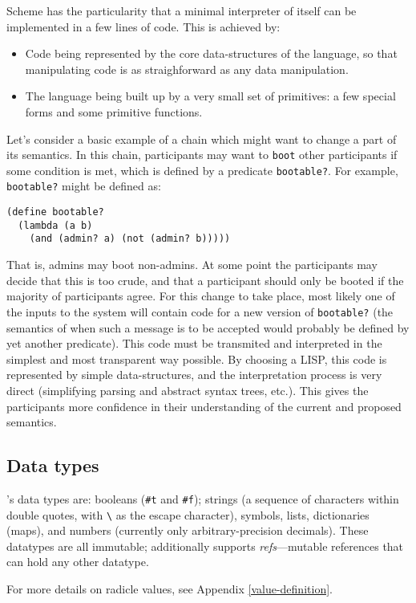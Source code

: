 Scheme has the particularity that a minimal interpreter of itself can
be implemented in a few lines of code. This is achieved by:
\begin{itemize}
  \item Code being represented by the core data-structures of the language, so
      that manipulating code is as straighforward as any data manipulation.
  \item The language being built up by a very small set of primitives: a few
    special forms and some primitive functions.
\end{itemize}
Let's consider a basic example of a chain which might want to change a part of
its semantics. In this chain, participants may want to \texttt{boot} other
participants if some condition is met, which is defined by a predicate
\texttt{bootable?}. For example, \texttt{bootable?} might be defined as:
\begin{lstlisting}
(define bootable?
  (lambda (a b)
    (and (admin? a) (not (admin? b)))))
\end{lstlisting}
That is, admins may boot non-admins. At some point the participants may decide
that this is too crude, and that a participant should only be booted if the
majority of participants agree. For this change to take place, most likely one of
the inputs to the system will contain code for a new version of
\texttt{bootable?} (the semantics of when such a message is to be accepted would
probably be defined by yet another predicate). This code must be transmited and
interpreted in the simplest and most transparent way possible. By choosing a LISP,
this code is represented by simple data-structures, and the interpretation process is
very direct (simplifying parsing and abstract syntax trees, etc.). This
gives the participants more confidence in their understanding of the current and
proposed semantics.

\subsection{Data types}
\rad{}'s data types are: booleans (\texttt{\#t} and
\texttt{\#f}); strings (a sequence of characters within double quotes, with
\verb$\$ as the escape character), symbols, lists, dictionaries
(maps), and numbers (currently only arbitrary-precision decimals). These
datatypes are all immutable; additionally \rad{} supports \emph{refs}---mutable
references that can hold any other datatype.

For more details on radicle values, see Appendix \ref{value-definition}.

